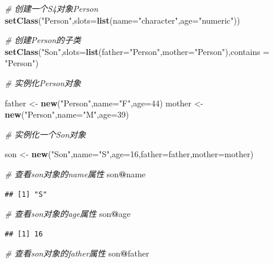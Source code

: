 \documentclass[]{book}
\newenvironment{Shaded}{\begin{snugshade}}{\end{snugshade}}
\newcommand{\KeywordTok}[1]{\textcolor[rgb]{0.13,0.29,0.53}{\textbf{#1}}}
\newcommand{\DataTypeTok}[1]{\textcolor[rgb]{0.13,0.29,0.53}{#1}}
\newcommand{\DecValTok}[1]{\textcolor[rgb]{0.00,0.00,0.81}{#1}}
\newcommand{\StringTok}[1]{\textcolor[rgb]{0.31,0.60,0.02}{#1}}
\newcommand{\CommentTok}[1]{\textcolor[rgb]{0.56,0.35,0.01}{\textit{#1}}}
\newcommand{\OperatorTok}[1]{\textcolor[rgb]{0.81,0.36,0.00}{\textbf{#1}}}
\newcommand{\NormalTok}[1]{#1}
\begin{document}
\begin{Shaded}
\begin{Highlighting}[]
\CommentTok{# 创建一个S4对象Person}
\KeywordTok{setClass}\NormalTok{(}\StringTok{"Person"}\NormalTok{,}\DataTypeTok{slots=}\KeywordTok{list}\NormalTok{(}\DataTypeTok{name=}\StringTok{"character"}\NormalTok{,}\DataTypeTok{age=}\StringTok{"numeric"}\NormalTok{))}

\CommentTok{# 创建Person的子类}
\KeywordTok{setClass}\NormalTok{(}\StringTok{"Son"}\NormalTok{,}\DataTypeTok{slots=}\KeywordTok{list}\NormalTok{(}\DataTypeTok{father=}\StringTok{"Person"}\NormalTok{,}\DataTypeTok{mother=}\StringTok{"Person"}\NormalTok{),}\DataTypeTok{contains =} \StringTok{"Person"}\NormalTok{)}

\CommentTok{# 实例化Person对象}

\NormalTok{father <-}\StringTok{ }\KeywordTok{new}\NormalTok{(}\StringTok{"Person"}\NormalTok{,}\DataTypeTok{name=}\StringTok{"F"}\NormalTok{,}\DataTypeTok{age=}\DecValTok{44}\NormalTok{)}
\NormalTok{mother <-}\StringTok{ }\KeywordTok{new}\NormalTok{(}\StringTok{"Person"}\NormalTok{,}\DataTypeTok{name=}\StringTok{"M"}\NormalTok{,}\DataTypeTok{age=}\DecValTok{39}\NormalTok{)}

\CommentTok{# 实例化一个Son对象}

\NormalTok{son <-}\StringTok{ }\KeywordTok{new}\NormalTok{(}\StringTok{"Son"}\NormalTok{,}\DataTypeTok{name=}\StringTok{"S"}\NormalTok{,}\DataTypeTok{age=}\DecValTok{16}\NormalTok{,}\DataTypeTok{father=}\NormalTok{father,}\DataTypeTok{mother=}\NormalTok{mother)}

\CommentTok{# 查看son对象的name属性}
\NormalTok{son}\OperatorTok{@}\NormalTok{name}
\end{Highlighting}
\end{Shaded}

\begin{verbatim}
## [1] "S"
\end{verbatim}

\begin{Shaded}
\begin{Highlighting}[]
\CommentTok{# 查看son对象的age属性}
\NormalTok{son}\OperatorTok{@}\NormalTok{age}
\end{Highlighting}
\end{Shaded}

\begin{verbatim}
## [1] 16
\end{verbatim}

\begin{Shaded}
\begin{Highlighting}[]
\CommentTok{# 查看son对象的father属性}
\NormalTok{son}\OperatorTok{@}\NormalTok{father}
\end{Highlighting}
\end{Shaded}
\end{document}

